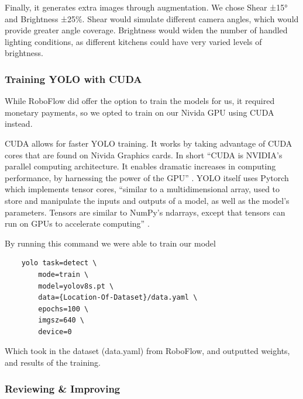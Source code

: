 \documentclass{article}
\begin{document}
Finally, it generates extra images through augmentation. We chose Shear ±15° and Brightness ±25\%. Shear would simulate different camera angles, which would provide greater angle coverage. Brightness would widen the number of handled lighting conditions, as different kitchens could have very varied levels of brightness.

    \subsubsection{Training YOLO with CUDA}
    While RoboFlow did offer the option to train the models for us, it required monetary payments, so we opted to train on our Nivida GPU using CUDA \cite{cudacuda} instead.

    CUDA allows for faster YOLO training. It works by taking advantage of CUDA cores that are found on Nivida Graphics cards. In short “CUDA is NVIDIA’s parallel computing architecture. It enables dramatic increases in computing performance, by harnessing the power of the GPU” \cite{ghorpade2012gpgpu}. YOLO itself uses Pytorch \cite{nvidiapytorch} which implements tensor cores, “similar to a multidimensional array, used to store and manipulate the inputs and outputs of a model, as well as the model’s parameters. Tensors are similar to NumPy’s ndarrays, except that tensors can run on GPUs to accelerate computing” \cite{nvidiapytorch}. 
    
    By running this command we were able to train our model
    \begin{verbatim}
    yolo task=detect \
        mode=train \
        model=yolov8s.pt \
        data={Location-Of-Dataset}/data.yaml \
        epochs=100 \
        imgsz=640 \
        device=0
    \end{verbatim}


    Which took in the dataset (data.yaml) from RoboFlow, and outputted weights, and results of the training.


    \subsubsection{Reviewing \& Improving}
\end{document}
